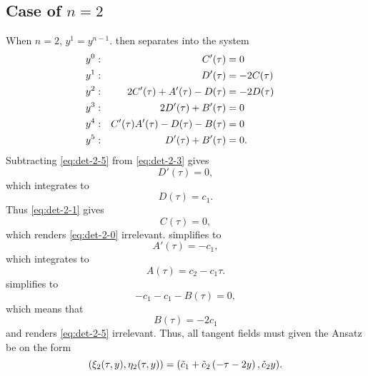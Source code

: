 \subsection{Case of \texorpdfstring{\(n=2\)}{n is 2}}

When \(n=2\), \(y^1 = y^{n-1}\).
 then separates into the system
\begin{subequations}
  \begin{flalign}
      y^0:  && C'(\tau) &= 0                               &&\FlLabel{eq:det-2-0}\\
      y^1:  && D'(\tau) &= -2C(\tau)                       &&\FlLabel{eq:det-2-1}\\
      y^2:  && 2C'(\tau) + A'(\tau) - D(\tau) &= -2D(\tau) &&\FlLabel{eq:det-2-2}\\
      y^3:  && 2D'(\tau) + B'(\tau) &= 0                   &&\FlLabel{eq:det-2-3}\\
      y^4:  && C'(\tau) A'(\tau) - D(\tau) - B(\tau) &= 0  &&\FlLabel{eq:det-2-4}\\
      y^5:  && D'(\tau) + B'(\tau) &= 0.                   &&\FlLabel{eq:det-2-5}
  \end{flalign}
\end{subequations}
Subtracting \cref{eq:det-2-5} from \cref{eq:det-2-3} gives
\begin{equation}
  D'(\tau) = 0,
\end{equation}
which integrates to
\begin{equation}
  D(\tau) = c_1.
\end{equation}
Thus \cref{eq:det-2-1} gives
\begin{equation}
  C(\tau) = 0,
\end{equation}
which renders \cref{eq:det-2-0} irrelevant.
 simplifies to
\begin{equation}
  A'(\tau) = - c_1,
\end{equation}
which integrates to
\begin{equation}
  A(\tau) = c_2 - c_1 \tau.
\end{equation}
 simplifies to
\begin{equation}
  - c_1 - c_1 - B(\tau) = 0,
\end{equation}
which means that
\begin{equation}
  B(\tau) = -2 c_1
\end{equation}
and renders \cref{eq:det-2-5} irrelevant.
Thus, all tangent fields must given the Ansatz be on the form
\begin{equation} \label{eq:hill-tangent-field-2}
  \pqty{\xi_2(\tau,y),\eta_2(\tau,y)} = 
  \pqty{\tilde{c}_1 + \tilde{c}_2 \left( - \tau -2 y \right), \tilde{c}_2 y}.
\end{equation}

